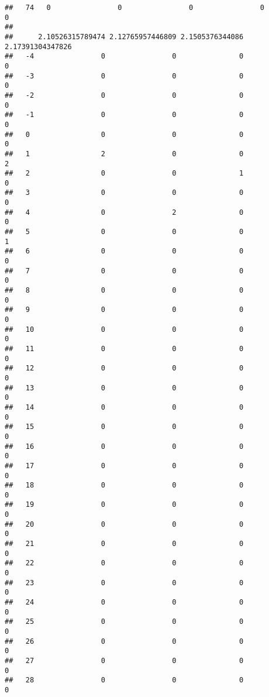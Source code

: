 \documentclass[]{article}
\begin{document}
\begin{verbatim}
##   74   0                0                0                0                0
##     
##      2.10526315789474 2.12765957446809 2.1505376344086 2.17391304347826
##   -4                0                0               0                0
##   -3                0                0               0                0
##   -2                0                0               0                0
##   -1                0                0               0                0
##   0                 0                0               0                0
##   1                 2                0               0                2
##   2                 0                0               1                0
##   3                 0                0               0                0
##   4                 0                2               0                0
##   5                 0                0               0                1
##   6                 0                0               0                0
##   7                 0                0               0                0
##   8                 0                0               0                0
##   9                 0                0               0                0
##   10                0                0               0                0
##   11                0                0               0                0
##   12                0                0               0                0
##   13                0                0               0                0
##   14                0                0               0                0
##   15                0                0               0                0
##   16                0                0               0                0
##   17                0                0               0                0
##   18                0                0               0                0
##   19                0                0               0                0
##   20                0                0               0                0
##   21                0                0               0                0
##   22                0                0               0                0
##   23                0                0               0                0
##   24                0                0               0                0
##   25                0                0               0                0
##   26                0                0               0                0
##   27                0                0               0                0
##   28                0                0               0                0

\end{verbatim}
\end{document}
